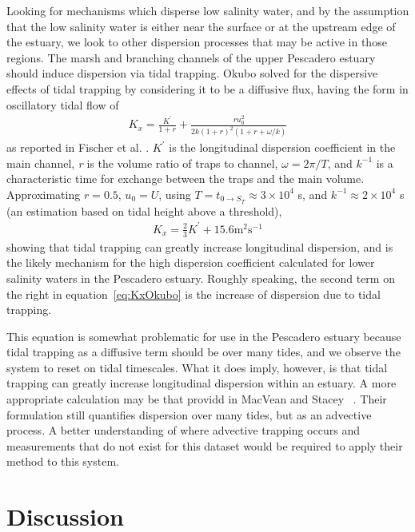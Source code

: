 Looking for mechanisms which disperse low salinity water, and by the assumption that the low salinity water is either near the surface or at the upstream edge of the estuary, we look to other dispersion processes that may be active in those regions. The marsh and branching channels of the upper Pescadero estuary should induce dispersion via tidal trapping. Okubo \parencite*{okubo_effect_1973} solved for the dispersive effects of tidal trapping by considering it to be a diffusive flux, having the form in oscillatory tidal flow of
\begin{eqnarray}
K_x = \frac{K^{'}}{1+r} + \frac{ru_0^2}{2k(1+r)^2(1+r+\omega / k)} \label{eq:KxOkubo}
\end{eqnarray}
as reported in Fischer et al. \parencite*{fischer_mixing_1979}. $K^{'}$ is the longitudinal dispersion coefficient in the main channel, \emph{r} is the volume ratio of traps to channel, $\omega=2\pi/T$, and $k^{-1}$ is a characteristic time for exchange between the traps and the main volume. Approximating $r=0.5$, $u_0=U$, using $T = t_{0\rightarrow S_T} \approx 3\times10^4$ s, and $k^{-1}\approx 2\times10^4$ s (an estimation based on tidal height above a threshold), 
\begin{eqnarray}
K_x = \frac{2}{3}K^{'} + 15.6 \mathrm{m}^2 \mathrm{s}^{-1} \label{eq:KxOkubownumbers}
\end{eqnarray}
showing that tidal trapping can greatly increase longitudinal dispersion, and is the likely mechanism for the high dispersion coefficient calculated for lower salinity waters in the Pescadero estuary. Roughly speaking, the second term on the right in equation~\ref{eq:KxOkubo} is the increase of dispersion due to tidal trapping.

This equation is somewhat problematic for use in the Pescadero estuary because tidal trapping as a diffusive term should be over many tides, and we observe the system to reset on tidal timescales. What it does imply, however, is that tidal trapping can greatly increase longitudinal dispersion within an estuary. A more appropriate calculation may be that providd in MacVean and Stacey ~\parencite*{macvean_estuarine_2011}. Their formulation still quantifies dispersion over many tides, but as an advective process. A better understanding of where advective trapping occurs and measurements that do not exist for this dataset would be required to apply their method to this system. 

\section{Discussion} \label{sec:discCh4}

